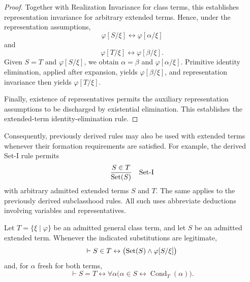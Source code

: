 \begin{proof}
Together with Realization Invariance for class terms,
this establishes representation invariance for arbitrary
extended terms. Hence, under the representation assumptions,
\[
\varphi[S/\xi]\leftrightarrow\varphi[\alpha/\xi]
\]
and
\[
\varphi[T/\xi]\leftrightarrow\varphi[\beta/\xi].
\]
Given \(S=T\) and \(\varphi[S/\xi]\), we obtain
\(\alpha=\beta\) and \(\varphi[\alpha/\xi]\).
Primitive identity elimination, applied after expansion,
yields \(\varphi[\beta/\xi]\), and representation
invariance then yields \(\varphi[T/\xi]\).

Finally, existence of representatives permits the
auxiliary representation assumptions to be discharged
by existential elimination. This establishes the
extended-term identity-elimination rule.
\end{proof}

Consequently, previously derived rules may also be used
with extended terms whenever their formation requirements
are satisfied. For example, the derived Set-I rule permits
\[
\frac{S\in T}{\operatorname{Set}(S)}
\quad\mathrm{Set}\text{-I}
\]
with arbitrary admitted extended terms \(S\) and \(T\).
The same applies to the previously derived subclasshood
rules. All such uses abbreviate deductions involving
variables and representatives.

\begin{metatheorem}
\label{meta:generalized-class-term-laws}
Let \(T=\{\xi\mid\varphi\}\) be an admitted general class
term, and let \(S\) be an admitted extended term. Whenever
the indicated substitutions are legitimate,
\[
\vdash
S\in T
\leftrightarrow
\bigl(\operatorname{Set}(S)\land\varphi[S/\xi]\bigr)
\]
and, for \(\alpha\) fresh for both terms,
\[
\vdash
S=T
\leftrightarrow
\forall\alpha\bigl(
\alpha\in S
\leftrightarrow
\operatorname{Cond}_T(\alpha)
\bigr).
\]
\end{metatheorem}

